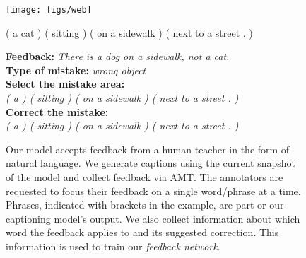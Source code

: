 \begin{figure}[t!]
\vspace{-0.mm}
\hspace{1mm}\begin{minipage}{0.3\linewidth}
\centering
\texttt{[image: figs/web]}
\end{minipage}
\hspace{3mm}
\begin{minipage}{0.65\linewidth}
\begin{tcolorbox}[colback=white, colframe=black!90,colbacktitle=gray!50!red!30!orange,left=3pt,right=3pt,top=0.1pt,bottom=0.0pt,boxrule=1.0pt,title=Machine]
{( a cat ) ( sitting ) ( on a sidewalk ) ( next to a street . )}%
\end{tcolorbox}
\vspace{1mm}
\begin{tcolorbox}[colback=white, colframe=black!90,colbacktitle=gray!68!blue,left=3pt,top=1pt,bottom=-0.8pt,boxrule=1.0pt,title=Human Teacher]
\begin{small}
\vspace{0.2mm}
{\bf Feedback:} \emph{ There is a dog on a sidewalk, not a cat.}\\[0.1mm]
{\bf Type of mistake:} \emph{wrong object}\\[0.1mm]
{\bf Select the mistake area:}\\[0.1mm]
 \emph{( a   ) ( sitting ) ( on a sidewalk ) ( next to a street . )}\\[0.4mm]
 {\bf Correct the mistake:}\\[0.1mm]
 \emph{( a  ) ( sitting ) ( on a sidewalk ) ( next to a street . )}
\end{small}
\end{tcolorbox}
\end{minipage}
\vspace{-2mm}
\caption{\small Our model accepts feedback from a human teacher in the form of natural language. We generate captions using the current snapshot of the model and collect feedback via AMT. The annotators are requested to focus their feedback on a single word/phrase at a time. Phrases, indicated with brackets in the example, are part or our captioning model's output. 
We also collect information about which word the feedback applies to and its suggested correction. This information is used to train our \emph{feedback network}.} 
\label{fig:web_feedback}
\vspace{-3mm}
\end{figure}
